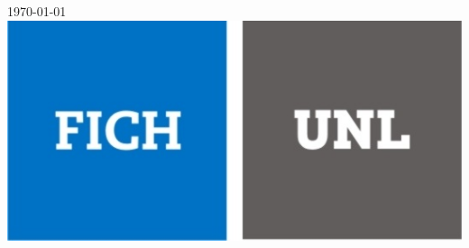 \documentclass[10pt]{book}
\begin{document}
\begin{titlepage}

{\large \textsc{\monthyeardate\today}}\\[5 cm] %

\includegraphics{img/logo.jpg}\\[3 cm] %
 
\vfill %
\end{titlepage}

\end{document}
